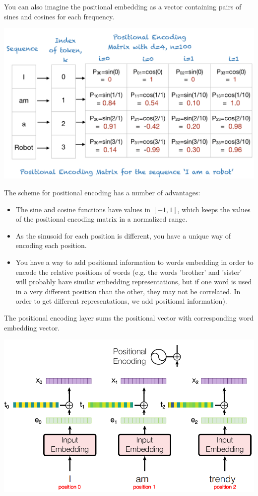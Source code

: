 You can also imagine the positional embedding as a vector containing pairs of sines and cosines for each frequency.
\begin{center}
    \includegraphics[scale=0.6]{images/Positional encoding.png}
\end{center}
The scheme for positional encoding has a number of advantages:
\begin{itemize}
    \item The sine and cosine functions have values in $[-1, 1]$, which keeps the values of the positional encoding matrix in a normalized range.

    \item As the sinusoid for each position is different, you have a unique way of encoding each position.

    \item You have a way to add positional information to words embedding in order to encode the relative positions of words (e.g. the words 'brother' and 'sister' will probably have similar embedding representations, but if one word is used in a very different position than the other, they may not be correlated. In order to get different representations, we add positional information). 
\end{itemize}
The positional encoding layer sums the positional vector with corresponding word embedding vector.
\begin{center}
    \includegraphics[scale=0.6]{images/positional encoding 2.png}
\end{center}

